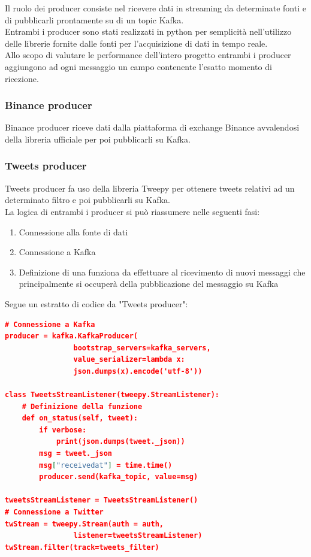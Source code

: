 Il ruolo dei producer consiste nel ricevere dati in streaming da determinate fonti e di
pubblicarli prontamente su di un topic Kafka.
\\
Entrambi i producer sono stati realizzati in python per semplicità nell'utilizzo delle
librerie fornite dalle fonti per l'acquisizione di dati in tempo reale.
\\
Allo scopo di valutare le performance dell'intero progetto entrambi i producer aggiungono
ad ogni messaggio un campo contenente l'esatto momento di ricezione.

\subsubsection{Binance producer}

Binance producer riceve dati dalla piattaforma di exchange Binance \cite{binance}
avvalendosi della libreria ufficiale per poi pubblicarli su Kafka.

\subsubsection{Tweets producer}

Tweets producer fa uso della libreria Tweepy \cite{tweepy} per ottenere tweets relativi
ad un determinato filtro e poi pubblicarli su Kafka.
\\
La logica di entrambi i producer si può riassumere nelle seguenti fasi:
\begin{enumerate}
    \item Connessione alla fonte di dati
    \item Connessione a Kafka
    \item Definizione di una funziona da effettuare al ricevimento di nuovi messaggi che
          principalmente si occuperà della pubblicazione del messaggio su Kafka
\end{enumerate}

Segue un estratto di codice da "Tweets producer":

\begin{lstlisting}[language=json,firstnumber=1]
# Connessione a Kafka
producer = kafka.KafkaProducer(
                bootstrap_servers=kafka_servers,
                value_serializer=lambda x: 
                json.dumps(x).encode('utf-8'))

class TweetsStreamListener(tweepy.StreamListener):
    # Definizione della funzione
    def on_status(self, tweet):
        if verbose:
            print(json.dumps(tweet._json))
        msg = tweet._json
        msg["receivedat"] = time.time()
        producer.send(kafka_topic, value=msg)

tweetsStreamListener = TweetsStreamListener()
# Connessione a Twitter
twStream = tweepy.Stream(auth = auth,
                listener=tweetsStreamListener)
twStream.filter(track=tweets_filter)
\end{lstlisting}

